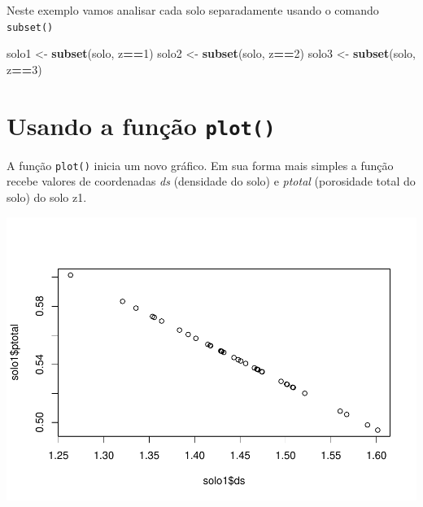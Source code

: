 \documentclass[
]{book}
\newenvironment{Shaded}{\begin{snugshade}}{\end{snugshade}}
\newcommand{\DecValTok}[1]{\textcolor[rgb]{0.00,0.00,0.81}{#1}}
\newcommand{\KeywordTok}[1]{\textcolor[rgb]{0.13,0.29,0.53}{\textbf{#1}}}
\newcommand{\NormalTok}[1]{#1}
\newcommand{\OperatorTok}[1]{\textcolor[rgb]{0.81,0.36,0.00}{\textbf{#1}}}
\newcommand{\StringTok}[1]{\textcolor[rgb]{0.31,0.60,0.02}{#1}}
\begin{document}
Neste exemplo vamos analisar cada solo separadamente usando o comando \texttt{subset()}

\begin{Shaded}
\begin{Highlighting}[]
\NormalTok{solo1 <-}\StringTok{ }\KeywordTok{subset}\NormalTok{(solo, z}\OperatorTok{==}\DecValTok{1}\NormalTok{)}
\NormalTok{solo2 <-}\StringTok{ }\KeywordTok{subset}\NormalTok{(solo, z}\OperatorTok{==}\DecValTok{2}\NormalTok{)}
\NormalTok{solo3 <-}\StringTok{ }\KeywordTok{subset}\NormalTok{(solo, z}\OperatorTok{==}\DecValTok{3}\NormalTok{)}
\end{Highlighting}
\end{Shaded}

\hypertarget{usando-a-funuxe7uxe3o-plot}{%
\section{\texorpdfstring{Usando a função \texttt{plot()}}{Usando a função plot()}}\label{usando-a-funuxe7uxe3o-plot}}

A função \texttt{plot()} inicia um novo gráfico. Em sua forma mais simples a função
recebe valores de coordenadas \emph{ds} (densidade do solo) e \emph{ptotal} (porosidade total do solo) do solo z1.

\begin{Shaded}
\end{Shaded}

\includegraphics{TudodoR_files/figure-latex/unnamed-chunk-152-1.pdf}
\end{document}
